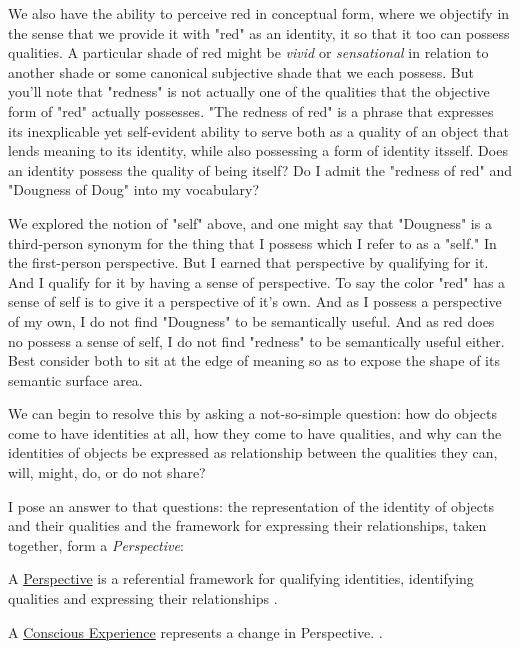 \documentclass[runningheads]{llncs}
\begin{document}
We also have the ability to perceive red in conceptual form, where we objectify in the sense that we provide it with "red" as an identity, it so that it too can possess qualities. A particular shade of red might be \emph{vivid} or \emph{sensational} in relation to another shade or some canonical subjective shade that we each possess. But you'll note that "redness" is not actually one of the qualities that the objective form of "red" actually possesses. "The redness of red" is a phrase that expresses its inexplicable yet self-evident ability to serve both as a quality of an object that lends meaning to its identity, while also possessing a form of identity itsself. Does an identity possess the quality of being itself? Do I admit the "redness of red" and "Dougness of Doug" into my vocabulary?

We explored the notion of "self" above, and one might say that "Dougness" is a third-person synonym for the thing that I possess which I refer to as a "self." In the first-person perspective. But I earned that perspective by qualifying for it. And I qualify for it by having a sense of perspective. To say the color "red" has a sense of self is to give it a perspective of it's own. And as I possess a perspective of my own, I do not find "Dougness" to be semantically useful. And as red does no possess a sense of self, I do not find "redness" to be semantically useful either. Best consider both to sit at the edge of meaning so as to expose the shape of its semantic surface area.

We can begin to resolve this by asking a not-so-simple question: how do objects come to have identities at all, how they come to have qualities, and why can the identities of objects be expressed as relationship between the qualities they can, will, might, do, or do not share? 

I pose an answer to that questions: the representation of the identity of objects and their qualities and the framework for expressing their relationships, taken together, form a \emph{Perspective}:

\setcounter{definition}{1}
\begin{sdefinition}
	A \href{https://github.com/DNA-Platform/inexplicable-phenomena/formalism/definitions/perspective.pdf}{Perspective} is a referential framework for qualifying identities, identifying qualities and expressing their relationships \cite{Formalism}.
\end{sdefinition}

\setcounter{definition}{2}
\begin{assertion}
	A \href{https://github.com/DNA-Platform/inexplicable-phenomena/formalism/assertions/conscious-experience.pdf}{Conscious Experience} represents a change in Perspective. \cite{Formalism}.
\end{assertion}
\end{document}
